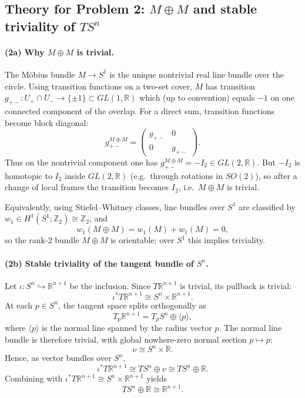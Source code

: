 \documentclass[12pt,a4paper]{article}
\theoremstyle{plain}
\theoremstyle{definition}      %
\begin{document}
	
	\subsection*{Theory for Problem 2: $M\oplus M$ and stable triviality of $TS^n$}
	
	\paragraph{\textbf{(2a) Why $M\oplus M$ is trivial.}}
	The Möbius bundle $M\to S^1$ is the unique nontrivial real line bundle over the circle.
	Using transition functions on a two-set cover, $M$ has transition $g_{+-}:U_+\cap U_-\to \{\pm 1\}\subset GL(1,\mathbb R)$
	which (up to convention) equals $-1$ on one connected component of the overlap.
	For a direct sum, transition functions become block diagonal:
	\[
	g^{M\oplus M}_{+-}=
	\begin{pmatrix}
		g_{+-} & 0\\
		0 & g_{+-}
	\end{pmatrix}.
	\]
	Thus on the nontrivial component one has $g^{M\oplus M}_{+-}=-I_2\in GL(2,\mathbb R)$.
	But $-I_2$ is homotopic to $I_2$ inside $GL(2,\mathbb R)$ (e.g.\ through rotations in $SO(2)$),
	so after a change of local frames the transition becomes $I_2$, i.e.\ $M\oplus M$ is trivial.
	
	Equivalently, using Stiefel--Whitney classes, line bundles over $S^1$ are classified by
	$w_1\in H^1(S^1;\mathbb Z_2)\cong \mathbb Z_2$, and
	\[
	w_1(M\oplus M)=w_1(M)+w_1(M)=0,
	\]
	so the rank-$2$ bundle $M\oplus M$ is orientable; over $S^1$ this implies triviality.
	
	\paragraph{\textbf{(2b) Stable triviality of the tangent bundle of $S^n$.}}
	Let $\iota:S^n\hookrightarrow \mathbb R^{n+1}$ be the inclusion. Since $T\mathbb R^{n+1}$ is trivial,
	its pullback is trivial:
	\[
	\iota^*T\mathbb R^{n+1}\cong S^n\times \mathbb R^{n+1}.
	\]
	At each $p\in S^n$, the tangent space splits orthogonally as
	\[
	T_p\mathbb R^{n+1} = T_pS^n \oplus \langle p\rangle,
	\]
	where $\langle p\rangle$ is the normal line spanned by the radius vector $p$.
	The normal line bundle is therefore trivial, with global nowhere-zero normal section $p\mapsto p$:
	\[
	\nu \cong S^n\times \mathbb R.
	\]
	Hence, as vector bundles over $S^n$,
	\[
	\iota^*T\mathbb R^{n+1} \cong TS^n \oplus \nu \cong TS^n \oplus \mathbb R.
	\]
	Combining with $\iota^*T\mathbb R^{n+1}\cong S^n\times \mathbb R^{n+1}$ yields
	\[
	TS^n\oplus \mathbb R \cong \mathbb R^{n+1}.
	\]
\end{document}
